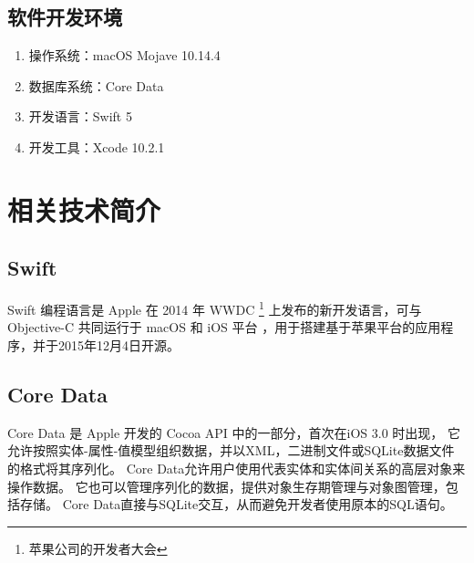 \subsection{软件开发环境}

\begin{enumerate}
	\item 操作系统：macOS Mojave 10.14.4
	\item 数据库系统：Core Data
	\item 开发语言：Swift 5
	\item 开发工具：Xcode 10.2.1
\end{enumerate}

\section{相关技术简介}
\subsection{Swift}
Swift 编程语言是 Apple 在 2014 年 WWDC \footnote{苹果公司的开发者大会} 上发布的新开发语言，可与 Objective-C 共同运行于 macOS 和 iOS 平台
，用于搭建基于苹果平台的应用程序，并于2015年12月4日开源\parencite{apple2018swift}。
\subsection{Core Data}
Core Data 是 Apple 开发的 Cocoa API 中的一部分，首次在iOS 3.0 时出现，
它允许按照实体-属性-值模型组织数据，并以XML，二进制文件或SQLite数据文件的格式将其序列化。
Core Data允许用户使用代表实体和实体间关系的高层对象来操作数据。
它也可以管理序列化的数据，提供对象生存期管理与对象图管理，包括存储。
Core Data直接与SQLite交互，从而避免开发者使用原本的SQL语句\parencite{com2018core}。
